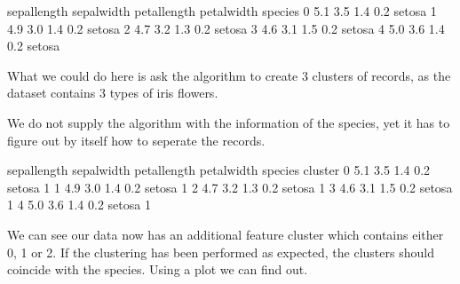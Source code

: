 \documentclass[letterpaper,10pt,english]{jupyterBook}
\begin{document}
\begin{sphinxVerbatim}[commandchars=\\\{\}]
   sepal\PYGZus{}length  sepal\PYGZus{}width  petal\PYGZus{}length  petal\PYGZus{}width species
0           5.1          3.5           1.4          0.2  setosa
1           4.9          3.0           1.4          0.2  setosa
2           4.7          3.2           1.3          0.2  setosa
3           4.6          3.1           1.5          0.2  setosa
4           5.0          3.6           1.4          0.2  setosa
\end{sphinxVerbatim}

\sphinxAtStartPar
What we could do here is ask the algorithm to create 3 clusters of records, as the dataset contains 3 types of iris flowers.

\sphinxAtStartPar
We do not supply the algorithm with the information of the species, yet it has to figure out by itself how to seperate the records.

\begin{sphinxVerbatim}[commandchars=\\\{\}]
   
\PYG{p}{[}\PYG{p}{]}  
\end{sphinxVerbatim}

\begin{sphinxVerbatim}[commandchars=\\\{\}]
   sepal\PYGZus{}length  sepal\PYGZus{}width  petal\PYGZus{}length  petal\PYGZus{}width species  cluster
0           5.1          3.5           1.4          0.2  setosa        1
1           4.9          3.0           1.4          0.2  setosa        1
2           4.7          3.2           1.3          0.2  setosa        1
3           4.6          3.1           1.5          0.2  setosa        1
4           5.0          3.6           1.4          0.2  setosa        1
\end{sphinxVerbatim}

\sphinxAtStartPar
We can see our data now has an additional feature cluster which contains either 0, 1 or 2.
If the clustering has been performed as expected, the clusters should coincide with the species.
Using a plot we can find out.
\end{document}

